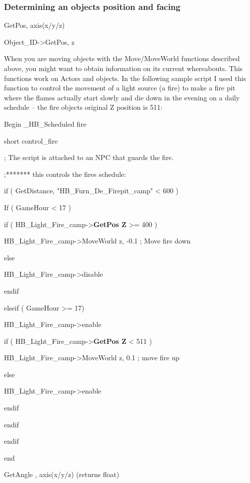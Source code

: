 \documentclass[
]{article}
\begin{document}
\hypertarget{determining-an-objects-position-and-facing}{%
\subsubsection{Determining an objects position and
facing}\label{determining-an-objects-position-and-facing}}

GetPos, axis(x/y/z)

Object\_ID-\textgreater GetPos, z

When you are moving objects with the Move/MoveWorld functions described
above, you might want to obtain information on its current whereabouts.
This functions work on Actors and objects. In the following sample
script I used this function to control the movement of a light source (a
fire) to make a fire pit where the flames actually start slowly and die
down in the evening on a daily schedule -- the fire objects original Z
position is 511:

Begin \_HB\_Scheduled fire

short control\_fire

; The script is attached to an NPC that guards the fire.

;******* this controls the fires schedule:

if ( GetDistance, "HB\_Furn\_De\_Firepit\_camp" \textless{} 600 )

If ( GameHour \textless{} 17 )

if ( HB\_Light\_Fire\_camp-\textgreater{}\textbf{GetPos Z} \textgreater=
400 )

HB\_Light\_Fire\_camp-\textgreater MoveWorld z, -0.1 ; Move fire down

else

HB\_Light\_Fire\_camp-\textgreater disable

endif

elseif ( GameHour \textgreater= 17)

HB\_Light\_Fire\_camp-\textgreater enable

if ( HB\_Light\_Fire\_camp-\textgreater{}\textbf{GetPos Z} \textless{}
511 )

HB\_Light\_Fire\_camp-\textgreater MoveWorld z, 0.1 ; move fire up

else

HB\_Light\_Fire\_camp-\textgreater enable

endif

endif

endif

end

GetAngle , axis(x/y/z) (returns float)
\end{document}

